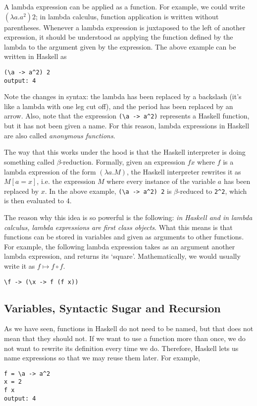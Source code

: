 \documentclass[11pt]{article}
\theoremstyle{nonumberplain}
\begin{document}
A lambda expression can be applied as a function. For example, we could write $(\lambda a. a^2) 2$; in lambda calculus, function application is written without parentheses. Whenever a lambda expression is juxtaposed to the left of another expression, it should be understood as applying the function defined by the lambda to the argument given by the expression. The above example can be written in Haskell as
\begin{lstlisting}
(\a -> a^2) 2
output: 4
\end{lstlisting}

Note the changes in syntax: the lambda has been replaced by a backslash (it's like a lambda with one leg cut off), and the period has been replaced by an arrow. Also, note that the expression \lstinline|(\a -> a^2)| represents a Haskell function, but it has not been given a name. For this reason, lambda expressions in Haskell are also called \emph{anonymous functions}.

The way that this works under the hood is that the Haskell interpreter is doing something called $\beta$-reduction. Formally, given an expression $f x$ where $f$ is a lambda expression of the form $(\lambda a. M)$, the Haskell interpreter rewrites it as $M[a=x]$, i.e. the expression $M$ where every instance of the variable $a$ has been replaced by $x$. In the above example, \lstinline|(\a -> a^2) 2| is $\beta$-reduced to \lstinline|2^2|, which is then evaluated to 4.

The reason why this idea is so powerful is the following: \emph{in Haskell and in lambda calculus, lambda expressions are first class objects}. What this means is that functions can be stored in variables and given as arguments to other functions. For example, the following lambda expression takes as an argument another lambda expression, and returns its `square'. Mathematically, we would usually write it as $f \mapsto f \circ f$.
\begin{lstlisting}
\f -> (\x -> f (f x))
\end{lstlisting}

\subsection{Variables, Syntactic Sugar and Recursion}

As we have seen, functions in Haskell do not need to be named, but that does not mean that they should not. If we want to use a function more than once, we do not want to rewrite its definition every time we do. Therefore, Haskell lets us name expressions so that we may reuse them later. For example,
\begin{lstlisting}
f = \a -> a^2
x = 2
f x
output: 4
\end{lstlisting}
\end{document}
